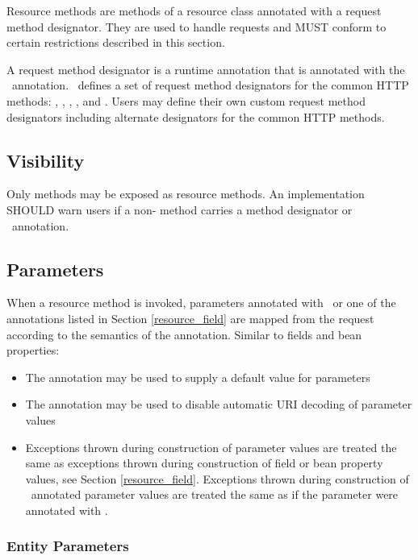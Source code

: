 Resource methods are methods of a resource class annotated with a request method designator. They are used to handle requests and MUST conform to certain restrictions described in this section.

A request method designator is a runtime annotation that is annotated with the \HttpMethod\ annotation. \jaxrs\ defines a set of request method designators for the common HTTP methods: , , , ,  and . Users may define their own custom request method designators including alternate designators for the common HTTP methods.

\subsection{Visibility}

Only  methods may be exposed as resource methods. An implementation SHOULD warn users if a non- method carries a method designator or \Path\ annotation.

\subsection{Parameters}
\label{resource_method_params}

When a resource method is invoked, parameters annotated with \FormParam\ or one of the  annotations listed in Section \ref{resource_field} are mapped from the request according to the semantics of the annotation. Similar to fields and bean properties:
\begin{itemize}
\item The  annotation may be used to supply a default value for parameters
\item The  annotation may be used to disable automatic URI decoding of parameter values
\item Exceptions thrown during construction of parameter values are treated the same as exceptions thrown during construction of field or bean property values, see Section \ref{resource_field}. Exceptions thrown during construction of \FormParam\ annotated parameter values are treated the same as if the parameter were annotated with \HeaderParam.
\end{itemize}

\subsubsection{Entity Parameters}
\label{entity_parameters}

